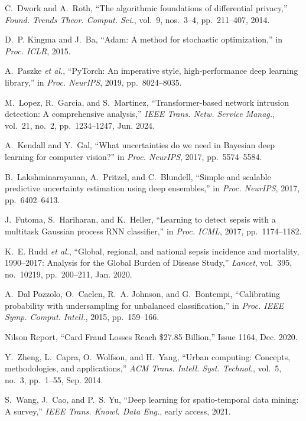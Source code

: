 \documentclass[10pt,journal,compsoc]{IEEEtran}
\begin{document}
\begin{thebibliography}{99}
C.~Dwork and A.~Roth, ``The algorithmic foundations of differential privacy,'' \emph{Found. Trends Theor. Comput. Sci.}, vol.~9, nos.~3--4, pp.~211--407, 2014.

D.~P. Kingma and J.~Ba, ``Adam: A method for stochastic optimization,'' in \emph{Proc. ICLR}, 2015.

A.~Paszke \emph{et al.}, ``PyTorch: An imperative style, high-performance deep learning library,'' in \emph{Proc. NeurIPS}, 2019, pp.~8024--8035.

M.~Lopez, R.~Garcia, and S.~Martinez, ``Transformer-based network intrusion detection: A comprehensive analysis,'' \emph{IEEE Trans. Netw. Service Manag.}, vol.~21, no.~2, pp.~1234--1247, Jun. 2024.

A.~Kendall and Y.~Gal, ``What uncertainties do we need in Bayesian deep learning for computer vision?'' in \emph{Proc. NeurIPS}, 2017, pp.~5574--5584.

B.~Lakshminarayanan, A.~Pritzel, and C.~Blundell, ``Simple and scalable predictive uncertainty estimation using deep ensembles,'' in \emph{Proc. NeurIPS}, 2017, pp.~6402--6413.

J.~Futoma, S.~Hariharan, and K.~Heller, ``Learning to detect sepsis with a multitask Gaussian process RNN classifier,'' in \emph{Proc. ICML}, 2017, pp.~1174--1182.

K.~E. Rudd \emph{et al.}, ``Global, regional, and national sepsis incidence and mortality, 1990--2017: Analysis for the Global Burden of Disease Study,'' \emph{Lancet}, vol.~395, no.~10219, pp.~200--211, Jan. 2020.

A.~Dal Pozzolo, O.~Caelen, R.~A. Johnson, and G.~Bontempi, ``Calibrating probability with undersampling for unbalanced classification,'' in \emph{Proc. IEEE Symp. Comput. Intell.}, 2015, pp.~159--166.

Nilson Report, ``Card Fraud Losses Reach \$27.85 Billion,'' Issue 1164, Dec. 2020.

Y.~Zheng, L.~Capra, O.~Wolfson, and H.~Yang, ``Urban computing: Concepts, methodologies, and applications,'' \emph{ACM Trans. Intell. Syst. Technol.}, vol.~5, no.~3, pp.~1--55, Sep. 2014.

S.~Wang, J.~Cao, and P.~S. Yu, ``Deep learning for spatio-temporal data mining: A survey,'' \emph{IEEE Trans. Knowl. Data Eng.}, early access, 2021.


\end{thebibliography}
\end{document}
